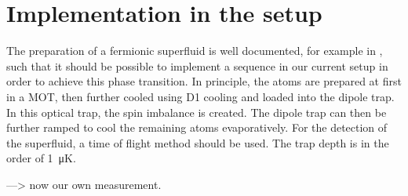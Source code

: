 \section{Implementation in the setup}

The preparation of a fermionic superfluid is well documented, for example in , such that it should be possible to implement a sequence in our current setup in order to achieve this phase transition. In principle, the atoms are prepared at first in a MOT, then further cooled using D1 cooling  and loaded into the dipole trap. In this optical trap, the spin imbalance is created. The dipole trap can then be further ramped to cool the remaining atoms evaporatively. For the detection of the superfluid, a time of flight method should be used. The trap depth is in the order of \SI{1}{\micro\kelvin}.

---> now our own measurement.